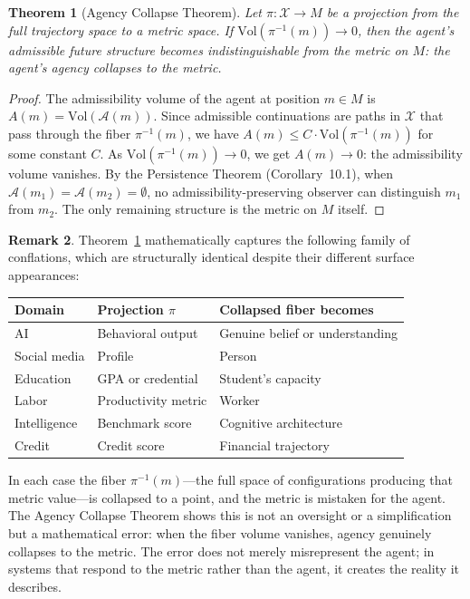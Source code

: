 \documentclass[12pt, oneside]{book}
\theoremstyle{flyxion}
\newtheorem{theorem}{Theorem}[chapter]
\theoremstyle{definition}
\newtheorem{remark}[theorem]{Remark}
\begin{document}
\begin{theorem}[Agency Collapse Theorem]
\label{thm:agency_collapse}
Let $\pi : \mathcal{X} \to M$ be a projection from
the full trajectory space to a metric space. If
$\mathrm{Vol}(\pi^{-1}(m)) \to 0$, then the agent's
admissible future structure becomes indistinguishable
from the metric on $M$: the agent's agency collapses
to the metric.
\end{theorem}

\begin{proof}
The admissibility volume of the agent at position
$m \in M$ is $A(m) = \mathrm{Vol}(\mathcal{A}(m))$.
Since admissible continuations are paths in
$\mathcal{X}$ that pass through the fiber
$\pi^{-1}(m)$, we have $A(m) \leq C \cdot
\mathrm{Vol}(\pi^{-1}(m))$ for some constant $C$.
As $\mathrm{Vol}(\pi^{-1}(m)) \to 0$, we get $A(m)
\to 0$: the admissibility volume vanishes. By the
Persistence Theorem (Corollary~10.1), when
$\mathcal{A}(m_1) = \mathcal{A}(m_2) = \emptyset$,
no admissibility-preserving observer can distinguish
$m_1$ from $m_2$. The only remaining structure is the
metric on $M$ itself.
\end{proof}

\begin{remark}
Theorem~\ref{thm:agency_collapse} mathematically
captures the following family of conflations, which
are structurally identical despite their different
surface appearances:

\medskip
\begin{center}
\renewcommand{\arraystretch}{1.3}
\begin{tabular}{lll}
\toprule
Domain & Projection $\pi$ & Collapsed fiber becomes \\
\midrule
AI & Behavioral output & Genuine belief or understanding \\
Social media & Profile & Person \\
Education & GPA or credential & Student's capacity \\
Labor & Productivity metric & Worker \\
Intelligence & Benchmark score & Cognitive architecture \\
Credit & Credit score & Financial trajectory \\
\bottomrule
\end{tabular}
\end{center}
\medskip

In each case the fiber $\pi^{-1}(m)$---the full space
of configurations producing that metric value---is
collapsed to a point, and the metric is mistaken for
the agent. The Agency Collapse Theorem shows this is
not an oversight or a simplification but a mathematical
error: when the fiber volume vanishes, agency
genuinely collapses to the metric. The error does
not merely misrepresent the agent; in systems that
respond to the metric rather than the agent, it
creates the reality it describes.
\end{remark}
\end{document}

